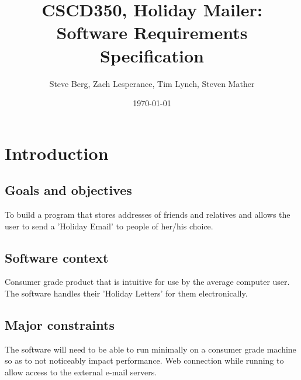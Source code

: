 \documentclass{article}
\title{CSCD350, Holiday Mailer: Software Requirements Specification}
\author{Steve Berg, Zach Lesperance, Tim Lynch, Steven Mather}
\date{\today}
\begin{document}
\maketitle{}
\pagebreak

\section{Introduction}

\subsection{Goals and objectives}
To build a program that stores addresses of friends and relatives and allows the user to send a 'Holiday Email' to people of her/his choice.


\subsection{Software context}
Consumer grade product that is intuitive for use by the average computer user. The software handles their 'Holiday Letters' for them electronically.

\subsection{Major constraints}
The software will need to be able to run minimally on a consumer grade machine so as to not noticeably impact performance.
Web connection while running to allow access to the external e-mail servers.

\end{document}
